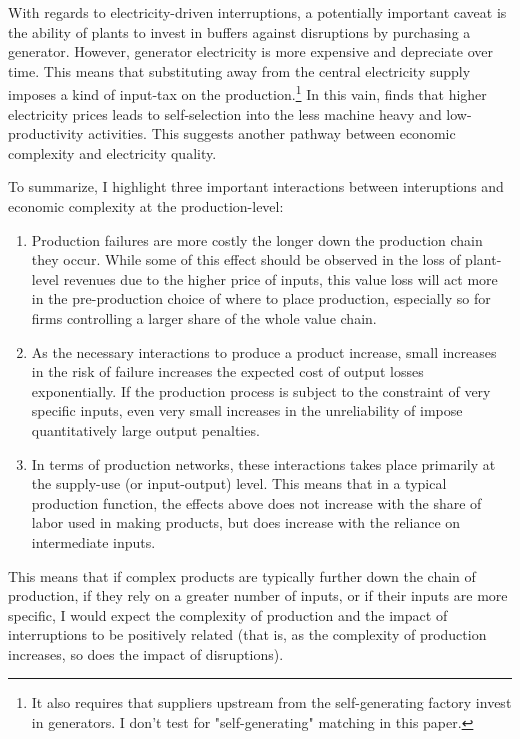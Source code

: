 \documentclass[11pt]{article}
\begin{document}
With regards to electricity-driven interruptions, a potentially important caveat is the ability of plants to invest in buffers against disruptions by purchasing a generator. However, generator electricity is more expensive and depreciate over time. This means that substituting away from the central electricity supply imposes a kind of input-tax on the production.\footnote{It also requires that suppliers upstream from the self-generating factory invest in generators. I don't test for "self-generating" matching in this paper.} In this vain, \cite{abeberese_electricity_2017} finds that higher electricity prices leads to self-selection into the less machine heavy and low-productivity activities. This suggests another pathway between economic complexity and electricity quality. 

To summarize, I highlight three important interactions between interuptions and economic complexity at the production-level:

\begin{enumerate}

\item Production failures are more costly the longer down the production chain they occur. While some of this effect should be observed in the loss of plant-level revenues due to the higher price of inputs, this value loss will act more in the pre-production choice of where to place production, especially so for firms controlling a larger share of the whole value chain.

\item As the necessary interactions to produce a product increase, small increases in the risk of failure increases the expected cost of output losses exponentially. If the production process is subject to the constraint of very specific inputs, even very small increases in the unreliability of impose quantitatively large output penalties.

\item In terms of production networks, these interactions takes place primarily at the supply-use (or input-output) level. This means that in a typical production function, the effects above does not increase with the share of labor used in making products, but does increase with the reliance on intermediate inputs.

\end{enumerate}

This means that if complex products are typically further down the chain of production, if they rely on a greater number of inputs, or if their inputs are more specific, I would expect the complexity of production and the impact of interruptions to be positively related (that is, as the complexity of production increases, so does the impact of disruptions). 
\end{document}

